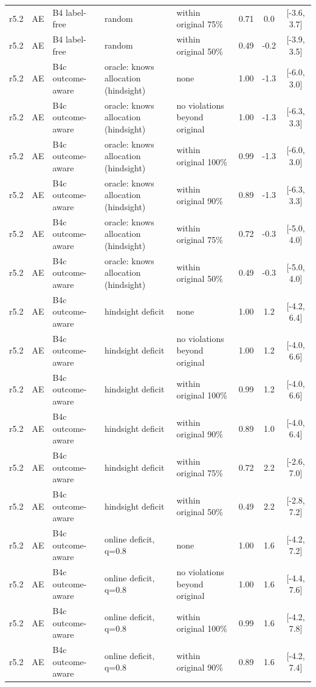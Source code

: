 \begin{longtable}{lllp{4.2cm}p{3.4cm}ccc}
r5.2 & AE & B4 label-free & random & within original 75\% & 0.71 & 0.0 & [-3.6, 3.7] \\
r5.2 & AE & B4 label-free & random & within original 50\% & 0.49 & -0.2 & [-3.9, 3.5] \\
r5.2 & AE & B4c outcome-aware & oracle: knows allocation (hindsight) & none & 1.00 & -1.3 & [-6.0, 3.0] \\
r5.2 & AE & B4c outcome-aware & oracle: knows allocation (hindsight) & no violations beyond original & 1.00 & -1.3 & [-6.3, 3.3] \\
r5.2 & AE & B4c outcome-aware & oracle: knows allocation (hindsight) & within original 100\% & 0.99 & -1.3 & [-6.0, 3.0] \\
r5.2 & AE & B4c outcome-aware & oracle: knows allocation (hindsight) & within original 90\% & 0.89 & -1.3 & [-6.3, 3.3] \\
r5.2 & AE & B4c outcome-aware & oracle: knows allocation (hindsight) & within original 75\% & 0.72 & -0.3 & [-5.0, 4.0] \\
r5.2 & AE & B4c outcome-aware & oracle: knows allocation (hindsight) & within original 50\% & 0.49 & -0.3 & [-5.0, 4.0] \\
r5.2 & AE & B4c outcome-aware & hindsight deficit & none & 1.00 & 1.2 & [-4.2, 6.4] \\
r5.2 & AE & B4c outcome-aware & hindsight deficit & no violations beyond original & 1.00 & 1.2 & [-4.0, 6.6] \\
r5.2 & AE & B4c outcome-aware & hindsight deficit & within original 100\% & 0.99 & 1.2 & [-4.0, 6.6] \\
r5.2 & AE & B4c outcome-aware & hindsight deficit & within original 90\% & 0.89 & 1.0 & [-4.0, 6.4] \\
r5.2 & AE & B4c outcome-aware & hindsight deficit & within original 75\% & 0.72 & 2.2 & [-2.6, 7.0] \\
r5.2 & AE & B4c outcome-aware & hindsight deficit & within original 50\% & 0.49 & 2.2 & [-2.8, 7.2] \\
r5.2 & AE & B4c outcome-aware & online deficit, q=0.8 & none & 1.00 & 1.6 & [-4.2, 7.2] \\
r5.2 & AE & B4c outcome-aware & online deficit, q=0.8 & no violations beyond original & 1.00 & 1.6 & [-4.4, 7.6] \\
r5.2 & AE & B4c outcome-aware & online deficit, q=0.8 & within original 100\% & 0.99 & 1.6 & [-4.2, 7.8] \\
r5.2 & AE & B4c outcome-aware & online deficit, q=0.8 & within original 90\% & 0.89 & 1.6 & [-4.2, 7.4] \\

\end{longtable}
